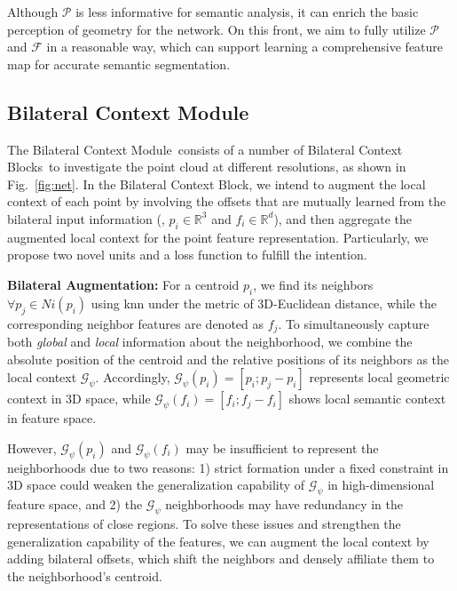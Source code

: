 \documentclass[10pt,twocolumn,letterpaper]{article}
\def\ourencoder{Bilateral Context Module}
\def\ourblock{Bilateral Context Block}
\def\ourblocks{Bilateral Context Blocks}
\begin{document}
Although $\mathcal{P}$ is less informative for semantic analysis, it can enrich the basic perception of geometry for the network. On this front, we aim to fully utilize $\mathcal{P}$ and $\mathcal{F}$ in a reasonable way, which can support learning a comprehensive feature map for accurate semantic segmentation.

\subsection{\ourencoder}
\label{sec:metho_cross}
The \ourencoder~consists of a number of \ourblocks~to investigate the point cloud at different resolutions, as shown in Fig.~\ref{fig:net}. In the \ourblock, we intend to augment the local context of each point by involving the offsets that are mutually learned from the bilateral input information (\ie, $p_i\in\mathbb{R}^{3}$ and $f_i\in\mathbb{R}^{d}$), and then aggregate the augmented local context for the point feature representation. Particularly, we propose two novel units and a loss function to fulfill the intention.  

\vspace{1mm}
\noindent \textbf{Bilateral Augmentation:}
For a centroid $p_i$, we find its neighbors ${\forall}p_j\in Ni(p_i)$ using knn under the metric of 3D-Euclidean distance, while the corresponding neighbor features are denoted as $f_j$. To simultaneously capture both \emph{global} and \emph{local} information about the neighborhood, we combine the absolute position of the centroid and the relative positions of its neighbors as the local context ${\mathcal{G}_\psi}$. Accordingly, ${\mathcal{G}_\psi}(p_i) = [p_i; p_j-p_i]$ represents local geometric context in 3D space, while ${\mathcal{G}_\psi}(f_i) = [f_i; f_j-f_i]$ shows local semantic context in feature space.

However, ${\mathcal{G}_\psi}(p_i)$ and ${\mathcal{G}_\psi}(f_i)$ may be insufficient to represent the neighborhoods due to two reasons: 1) strict formation under a fixed constraint in 3D space could weaken the generalization capability of ${\mathcal{G}_\psi}$ in high-dimensional feature space, and 2) the ${\mathcal{G}_\psi}$ neighborhoods may have redundancy in the representations of close regions. To solve these issues and strengthen the generalization capability of the features, we can augment the local context by adding bilateral offsets, which shift the neighbors and densely affiliate them to the neighborhood's centroid.
\end{document}
